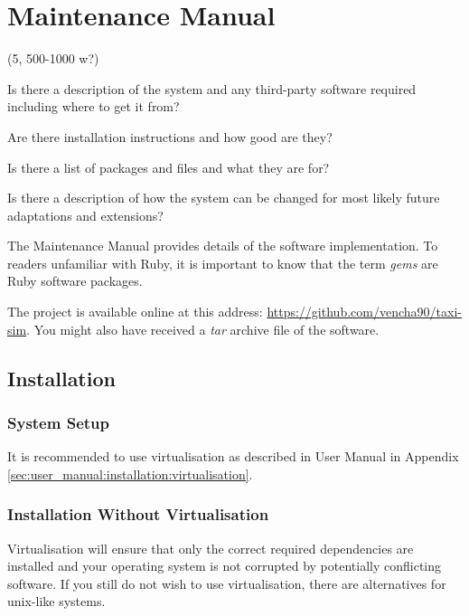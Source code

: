 \clearpage
\section{Maintenance Manual}
\label{sec:maintenance_manual}

(5, 500-1000 w?)

Is there a description of the system and any third-party software required
including where to get it from?

Are there installation instructions and how good are they?

Is there a list of packages and files and what they are for?

Is there a description of how the system can be changed for most likely future
adaptations and extensions?



The Maintenance Manual provides details of the software implementation. To
readers unfamiliar with Ruby, it is important to know that the term
\textit{gems} are Ruby software packages.

The project is available online at this address:
\url{https://github.com/vencha90/taxi-sim}. You might also have received a
\textit{tar} archive file of the software.



\subsection{Installation}

\subsubsection{System Setup}

It is recommended to use virtualisation as described in User Manual in Appendix
\ref{sec:user_manual:installation:virtualisation}.


\subsubsection{Installation Without Virtualisation}
\label{sec:maintenance_manual:native_install}

Virtualisation will ensure that only the correct required dependencies are
installed and your operating system is not corrupted by potentially conflicting
software. If you still do not wish to use virtualisation, there are
alternatives for unix-like systems.


